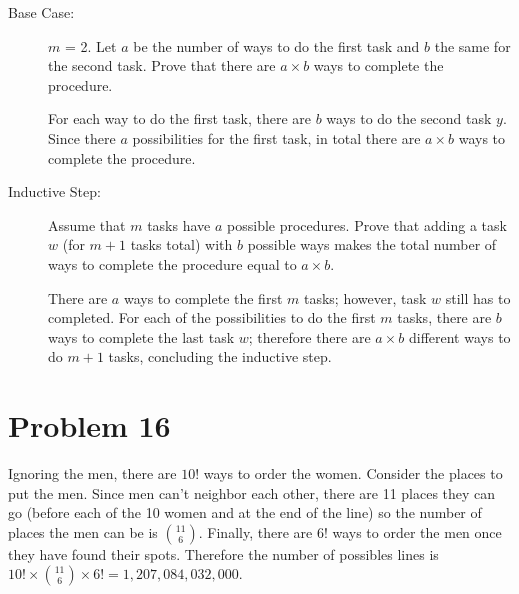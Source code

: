 \documentclass[11pt]{article}
\begin{document}
\begin{description}
	\item[Base Case: ] $m$ = 2. Let $a$ be the number of ways to do the first task and $b$ the same for the second task. Prove that there are $a 
	\times b$ ways to complete the procedure.


	For each way to do the first task, there are $b$ ways to do the second task $y$. Since there $a$ possibilities for the first task, in total 
	there are $a \times b$ ways to complete the procedure.
	
	
	\item[Inductive Step: ] Assume that $m$ tasks have $a$ possible procedures. Prove that adding a task $w$ (for $m+1$ tasks total) with $b$ possible ways makes the total number of ways to complete the procedure equal to $a \times b$.
	
	
	There are $a$ ways to complete the first $m$ tasks; however, task $w$ still has to completed. For each of the possibilities to do the first $m$ tasks, there are $b$ ways to complete the last task $w$; therefore there are $a \times b$ different ways to do $m+1$ tasks, concluding the inductive step.
\end{description}

\section*{Problem 16}

Ignoring the men, there are $10!$ ways to order the women. Consider the places to put the men. Since men can't neighbor each other, there are 11 places they can go (before each of the 10 women and at the end of the line) so the number of places the men can be is $11 \choose 6$. Finally, there are $6!$ ways to order the men once they have found their spots. Therefore the number of possibles lines is $10! \times {11 \choose 6} \times 6! = 1,207,084,032,000 $.
\end{document}
